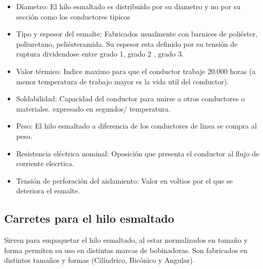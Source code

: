 \documentclass{report}
\begin{document}
      \begin{itemize}
        
        \item{Díametro:} El hilo esmaltado es distribuido por su diametro y no por su sección como los conductores tipicos

        \item{Tipo y espesor del esmalte:} Fabricados usualmente con barnices de poliéster, poliuretano, peliésteramida. Su espesor esta 
          definido por su tensión de ruptura dividendose entre grado 1, grado 2 , grado 3.

        \item{Valor térmico:} Indice maximo para que el conductor trabaje 20.000 horas (a menor temperatura de trabajo 
          mayor es la vida util del conductor).

        \item{Soldabilidad:} Capacidad del conductor para unirse a otros conductores o materiales. expresado en segundos/ temperatura.

        \item{Peso:} El hilo esmaltado a diferencia de los conductores de linea se compra al peso.

        \item{Resistencia eléctrica nominal:} Oposición que presenta el conductor al flujo de corriente elecrtica.

        \item{Tensión de perforación del aislamiento:} Valor en voltios por el que se deteriora el esmalte.

      \end{itemize}
    \vspace{2em}
    \subsection{Carretes para el hilo esmaltado}\label{ssec:carretes_hilo}
      Sirven para empaquetar el hilo esmaltado, al estar normalizados en tamaño y forma permiten su uso en distintas marcas de bobinadoras.
      Son fabricados en distintos tamaños y formas (Cilíndrico, Bicónico y Angular).
\end{document}
